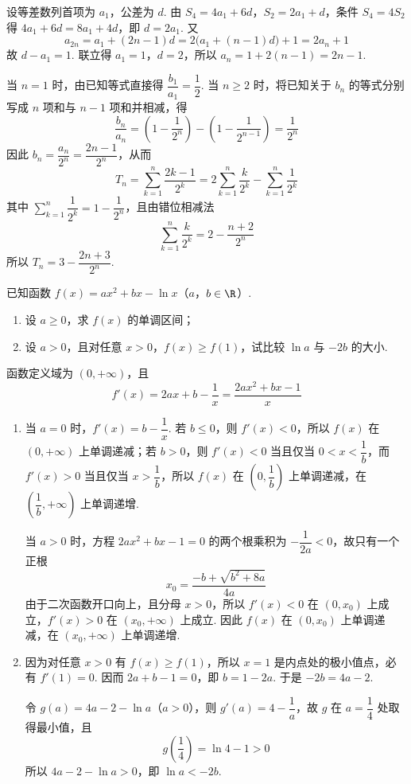 \begin{solution}
设等差数列首项为 \(a_1\)，公差为 \(d\). 由 \(S_4=4a_1+6d\)，\(S_2=2a_1+d\)，条件 \(S_4=4S_2\) 得 \(4a_1+6d=8a_1+4d\)，即 \(d=2a_1\). 又
\[
a_{2n}=a_1+(2n-1)d=2\bigl(a_1+(n-1)d\bigr)+1=2a_n+1
\]
故 \(d-a_1=1\). 联立得 \(a_1=1\)，\(d=2\)，所以 \(a_n=1+2(n-1)=2n-1\).

当 \(n=1\) 时，由已知等式直接得 \(\dfrac{b_1}{a_1}=\dfrac12\). 当 \(n\geqslant2\) 时，将已知关于 \(b_n\) 的等式分别写成 \(n\) 项和与 \(n-1\) 项和并相减，得
\[
\frac{b_n}{a_n}=\left(1-\frac{1}{2^n}\right)-\left(1-\frac{1}{2^{n-1}}\right)=\frac{1}{2^n}
\]
因此 \(b_n=\dfrac{a_n}{2^n}=\dfrac{2n-1}{2^n}\)，从而
\[
T_n=\sum_{k=1}^{n}\frac{2k-1}{2^k}=2\sum_{k=1}^{n}\frac{k}{2^k}-\sum_{k=1}^{n}\frac{1}{2^k}
\]
其中 \(\sum_{k=1}^{n}\dfrac{1}{2^k}=1-\dfrac{1}{2^n}\)，且由错位相减法
\[
\sum_{k=1}^{n}\frac{k}{2^k}=2-\frac{n+2}{2^n}
\]
所以 \(T_n=3-\dfrac{2n+3}{2^n}\).
\end{solution}

\begin{problem}
已知函数 \( f(x) = ax^2 + bx - \ln x  \)（\(a\)，\(b \in \R\)）.

\begin{enumerate}
\item 设 \(a \geqslant 0\)，求 \(f(x)\) 的单调区间；
\item 设 \(a > 0\)，且对任意 \(x > 0\)，\(f(x) \geqslant f(1)\)，试比较 \(\ln a\) 与 \(-2b\) 的大小.
\end{enumerate}
\end{problem}

\begin{solution}
函数定义域为 \((0,+\infty)\)，且
\[
f'(x)=2ax+b-\frac{1}{x}=\frac{2ax^2+bx-1}{x}
\]
\begin{enumerate}
\item 当 \(a=0\) 时，\(f'(x)=b-\dfrac1x\). 若 \(b\leqslant0\)，则 \(f'(x)<0\)，所以 \(f(x)\) 在 \((0,+\infty)\) 上单调递减；若 \(b>0\)，则 \(f'(x)<0\) 当且仅当 \(0<x<\dfrac1b\)，而 \(f'(x)>0\) 当且仅当 \(x>\dfrac1b\)，所以 \(f(x)\) 在 \(\left(0,\dfrac1b\right)\) 上单调递减，在 \(\left(\dfrac1b,+\infty\right)\) 上单调递增.

当 \(a>0\) 时，方程 \(2ax^2+bx-1=0\) 的两个根乘积为 \(-\dfrac{1}{2a}<0\)，故只有一个正根
\[
x_0=\frac{-b+\sqrt{b^2+8a}}{4a}
\]
由于二次函数开口向上，且分母 \(x>0\)，所以 \(f'(x)<0\) 在 \((0,x_0)\) 上成立，\(f'(x)>0\) 在 \((x_0,+\infty)\) 上成立. 因此 \(f(x)\) 在 \(\left(0,x_0\right)\) 上单调递减，在 \(\left(x_0,+\infty\right)\) 上单调递增.
\item 因为对任意 \(x>0\) 有 \(f(x)\geqslant f(1)\)，所以 \(x=1\) 是内点处的极小值点，必有 \(f'(1)=0\). 因而 \(2a+b-1=0\)，即 \(b=1-2a\). 于是 \(-2b=4a-2\).

令 \(g(a)=4a-2-\ln a\)（\(a>0\)），则 \(g'(a)=4-\dfrac1a\)，故 \(g\) 在 \(a=\dfrac14\) 处取得最小值，且
\[
g\left(\frac14\right)=\ln4-1>0
\]
所以 \(4a-2-\ln a>0\)，即 \(\ln a<-2b\).
\end{enumerate}
\end{solution}

